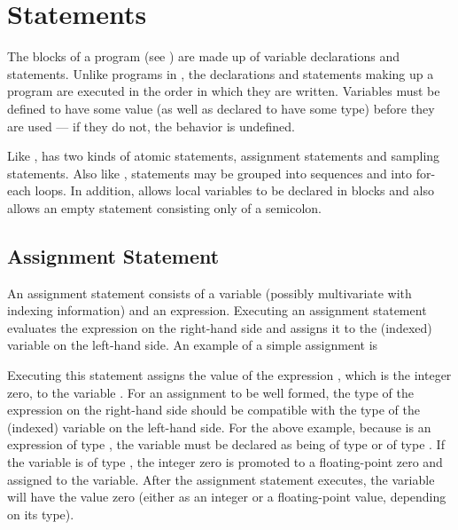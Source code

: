 




\chapter{Statements}

\noindent 
The blocks of a \Stan program (see ) are made up of
variable declarations and statements.  Unlike programs in \BUGS, the
declarations and statements making up a \Stan program are executed in
the order in which they are written.  Variables must be defined to
have some value (as well as declared to have some type) before they
are used --- if they do not, the behavior is undefined.

Like \BUGS, \Stan has two kinds of atomic statements, assignment
statements and sampling statements.  Also like \BUGS, statements may
be grouped into sequences and into for-each loops.  In addition, \Stan
allows local variables to be declared in blocks and also allows an
empty statement consisting only of a semicolon.

\section{Assignment Statement}

An assignment statement consists of a variable (possibly multivariate
with indexing information) and an expression.  Executing an
assignment statement evaluates the expression on the right-hand side
and assigns it to the (indexed) variable on the left-hand side.  An
example of a simple assignment is
%
\begin{quote}
\end{quote}
%
Executing this statement assigns the value of the expression ,
which is the integer zero, to the variable .  For an assignment
to be well formed, the type of the expression on the right-hand side
should be compatible with the type of the (indexed) variable on the
left-hand side.  For the above example, because  is an
expression of type , the variable  must be declared
as being of type  or of type .  If the variable
is of type , the integer zero is promoted to a
floating-point zero and assigned to the variable.  After the
assignment statement executes, the variable  will have the
value zero (either as an integer or a floating-point value, depending on
its type).

